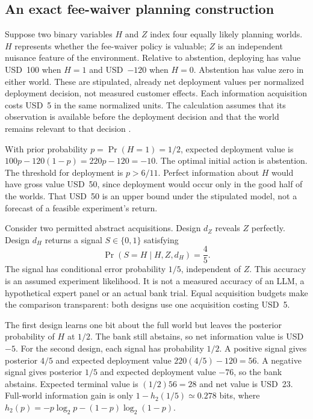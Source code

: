 \subsection{An exact fee-waiver planning construction}

Suppose two binary variables $H$ and $Z$ index four equally likely planning
worlds. $H$ represents whether the fee-waiver policy is valuable; $Z$ is an
independent nuisance feature of the environment. Relative to abstention,
deploying has value USD~100 when $H=1$ and USD~$-120$ when $H=0$.
Abstention has value zero in either world. These are stipulated, already net
deployment values per normalized deployment decision, not measured customer
effects. Each information acquisition costs USD~5 in the same normalized
units. The calculation assumes that its observation is available before the
deployment decision and that the world remains relevant to that decision
\cite{exec13_active_exact}.

With prior probability $p=\Pr(H=1)=1/2$, expected deployment value is
$100p-120(1-p)=220p-120=-10$. The optimal initial action is abstention.
The threshold for deployment is $p>6/11$. Perfect information about $H$
would have gross value USD~50, since deployment would occur only in the good
half of the worlds. That USD~50 is an upper bound under the stipulated model,
not a forecast of a feasible experiment's return.

Consider two permitted abstract acquisitions. Design $d_Z$ reveals $Z$
perfectly. Design $d_H$ returns a signal $S\in\{0,1\}$ satisfying
\[
 \Pr(S=H\mid H,Z,d_H)=\frac45.
\]
The signal has conditional error probability $1/5$, independent of $Z$.
This accuracy is an assumed experiment likelihood. It is not a measured
accuracy of an LLM, a hypothetical expert panel or an actual bank trial.
Equal acquisition budgets make the comparison transparent: both designs
use one acquisition costing USD~5.

The first design learns one bit about the full world but leaves the posterior
probability of $H$ at $1/2$. The bank still abstains, so net information value
is USD~$-5$. For the second design, each signal has probability $1/2$.
A positive signal gives posterior $4/5$ and expected deployment value
$220(4/5)-120=56$. A negative signal gives posterior $1/5$ and expected
deployment value $-76$, so the bank abstains. Expected terminal value is
$(1/2)56=28$ and net value is USD~23. Full-world information gain is only
$1-h_2(1/5)\simeq0.278$ bits, where
$h_2(p)=-p\log_2p-(1-p)\log_2(1-p)$.

